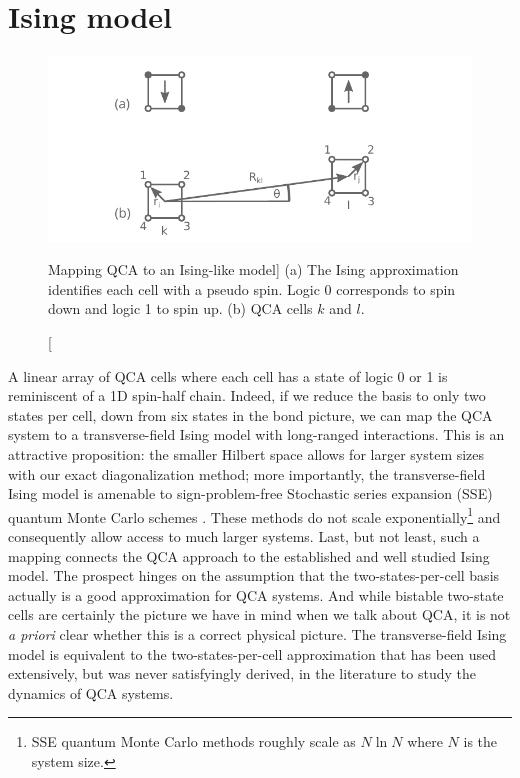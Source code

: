 \section{Ising model}

%
\begin{figure}
  \center
  \includegraphics{ising}
  \caption
  [Mapping QCA to an Ising-like model]
  {
  (a) The Ising approximation identifies each cell with a pseudo spin. Logic 0
  corresponds to spin down and logic 1 to spin up. (b) QCA cells $k$ and $l$. 
  }
  \label{fig:ising}
\end{figure}
%
A linear array of QCA cells where each cell has a state of logic 0 or 1 is
reminiscent of a 1D spin-half chain. Indeed, if we reduce the basis to
only two states per cell, down from six states in the bond picture, we can map
the QCA system to a transverse-field Ising model with long-ranged interactions.
This is an attractive proposition: the smaller Hilbert space allows for larger
system sizes with our exact diagonalization method; more importantly, the
transverse-field Ising model is amenable to sign-problem-free Stochastic series
expansion (SSE) quantum Monte Carlo schemes \cite{Sandvik2003}. These methods do
not scale exponentially\footnote{SSE quantum Monte Carlo methods roughly scale
as $N \ln N$ where $N$ is the system size.} and consequently allow access to
much larger systems. Last, but not least, such a mapping connects the QCA
approach to the established and well studied Ising model. The prospect hinges on
the assumption that the two-states-per-cell basis actually is a good
approximation for QCA systems. And while bistable two-state cells are certainly
the picture we have in mind when we talk about QCA, it is not \emph{a priori}
clear whether this is a correct physical picture. The transverse-field Ising
model is equivalent to the two-states-per-cell approximation that has been used
extensively, but was never satisfyingly derived, in the literature to study the
dynamics of QCA systems.

